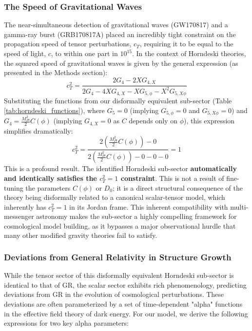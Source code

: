 \documentclass[twocolumn]{aastex631}
\begin{document}
\subsubsection{The Speed of Gravitational Waves}
The near-simultaneous detection of gravitational waves (GW170817) and a gamma-ray burst (GRB170817A) placed an incredibly tight constraint on the propagation speed of tensor perturbations, $c_T$, requiring it to be equal to the speed of light, $c$, to within one part in $10^{15}$. In the context of Horndeski theories, the squared speed of gravitational waves is given by the general expression (as presented in the Methods section):
\begin{equation}
c_T^2 = \frac{2G_4 - 2XG_{4,X}}{2G_4 - 4XG_{4,X} - XG_{5,\phi} - X^2 G_{5,X\phi}}
\end{equation}
Substituting the functions from our disformally equivalent sub-sector (Table \ref{tab:horndeski_functions}), where $G_5 = 0$ (implying $G_{5,\phi}=0$ and $G_{5,X\phi}=0$) and $G_4 = \frac{M_{Pl}^2}{2} C(\phi)$ (implying $G_{4,X} = 0$ as $C$ depends only on $\phi$), this expression simplifies dramatically:
\begin{equation}
c_T^2 = \frac{2 \left(\frac{M_{Pl}^2}{2} C(\phi)\right) - 0}{2 \left(\frac{M_{Pl}^2}{2} C(\phi)\right) - 0 - 0 - 0} = 1
\end{equation}
This is a profound result. The identified Horndeski sub-sector \textbf{automatically and identically satisfies the $c_T^2=1$ constraint}. This is not a result of fine-tuning the parameters $C(\phi)$ or $D_0$; it is a direct structural consequence of the theory being disformally related to a canonical scalar-tensor model, which inherently has $c_T^2=1$ in its Jordan frame. This inherent compatibility with multi-messenger astronomy makes the sub-sector a highly compelling framework for cosmological model building, as it bypasses a major observational hurdle that many other modified gravity theories fail to satisfy.

\subsubsection{Deviations from General Relativity in Structure Growth}
While the tensor sector of this disformally equivalent Horndeski sub-sector is identical to that of GR, the scalar sector exhibits rich phenomenology, predicting deviations from GR in the evolution of cosmological perturbations. These deviations are often parameterized by a set of time-dependent "alpha" functions in the effective field theory of dark energy. For our model, we derive the following expressions for two key alpha parameters:
\end{document}
